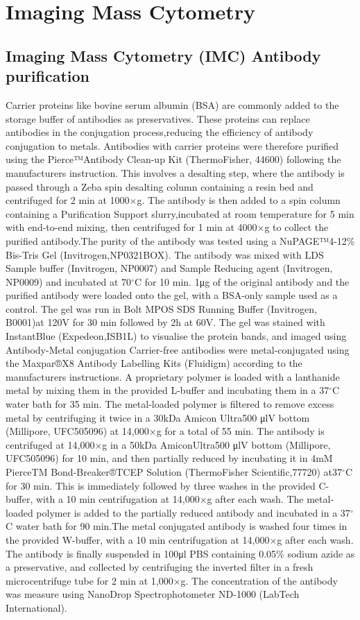\section{Imaging Mass Cytometry}
\subsection{Imaging Mass Cytometry (IMC) Antibody purification}
Carrier proteins like bovine serum albumin (BSA) are commonly added to the storage buffer of antibodies as preservatives. These proteins can replace antibodies in the conjugation process,reducing the efficiency of antibody conjugation to metals. Antibodies with carrier proteins were therefore purified using the Pierce™Antibody Clean-up Kit (ThermoFisher, 44600) following the manufacturers instruction.  This involves a desalting step, where the antibody is passed through a Zeba spin desalting column containing a resin bed and centrifuged for 2 min at 1000×g. The antibody is then added to a spin column containing a Purification Support slurry,incubated at room temperature for 5 min with end-to-end mixing, then centrifuged for 1 min at 4000×g to collect the purified antibody.The purity of the antibody was tested using a NuPAGE™4-12\% Bis-Tris Gel (Invitrogen,NP0321BOX). The antibody was mixed with LDS Sample buffer (Invitrogen, NP0007) and Sample Reducing agent (Invitrogen, NP0009) and incubated at 70${^\circ}$C for 10 min. 1μg of the original antibody and the purified antibody were loaded onto the gel, with a BSA-only sample used as a control. The gel was run in Bolt MPOS SDS Running Buffer (Invitrogen, B0001)at 120V for 30 min followed by 2h at 60V. The gel was stained with InstantBlue (Expedeon,ISB1L) to visualise the protein bands, and imaged using Antibody-Metal conjugation Carrier-free antibodies were metal-conjugated using the Maxpar®X8 Antibody Labelling Kits (Fluidigm) according to the manufacturers instructions. A proprietary polymer is loaded with a lanthanide metal by mixing them in the provided L-buffer and incubating them in a 37${^\circ}$C water bath for 35 min. The metal-loaded polymer is filtered to remove excess metal by centrifuging it twice in a 30kDa Amicon Ultra500 μlV bottom (Millipore, UFC505096) at 14,000×g for a total of 55 min. The antibody is centrifuged at 14,000×g in a 50kDa AmiconUltra500 μlV bottom (Millipore,  UFC505096) for 10 min,  and then partially reduced by incubating it in 4mM PierceTM Bond-Breaker®TCEP Solution (ThermoFisher Scientific,77720) at37${^\circ}$C for 30 min.  This is immediately followed by three washes in the provided C-buffer, with a 10 min centrifugation at 14,000×g after each wash. The metal-loaded polymer is added to the partially reduced antibody and incubated in a 37${^\circ}$C water bath for 90 min.The metal conjugated antibody is washed four times in the provided W-buffer, with a 10 min centrifugation at 14,000×g after each wash. The antibody is finally suspended in 100μl PBS containing 0.05\% sodium azide as a preservative, and collected by centrifuging the inverted filter in a fresh microcentrifuge tube for 2 min at 1,000×g. The concentration of the antibody was measure using NanoDrop Spectrophotometer ND-1000 (LabTech International).

